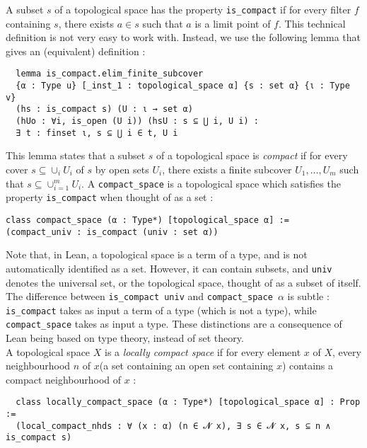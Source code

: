 \documentclass[11pt]{article}
\newcommand{\lean}[1]{\texttt{#1}\xspace} %
\begin{document}
A subset $s$ of a topological space has the property \lean{is\_compact} if for every filter $f$ containing 
$s$, there exists $a \in s$ such that $a$ is a limit point of $f$. This technical definition 
is not very easy to work with. Instead, we use the following lemma that gives an (equivalent) definition : 
\begin{lstlisting}
  lemma is_compact.elim_finite_subcover 
  {α : Type u} [_inst_1 : topological_space α] {s : set α} {ι : Type v} 
  (hs : is_compact s) (U : ι → set α) 
  (hUo : ∀i, is_open (U i)) (hsU : s ⊆ ⋃ i, U i) :
  ∃ t : finset ι, s ⊆ ⋃ i ∈ t, U i
\end{lstlisting}
This lemma states that a subset $s$ of a topological space is \textit{compact} if for every cover $s \subseteq \cup_{i} U_i$
of $s$ by open sets $U_i$, there exists a finite subcover $U_1, \dots, U_m$ such that
$s \subseteq \cup_{i = 1}^m U_i$. A \lean{compact\_space} is a topological space which satisfies the property 
\lean{is\_compact} when thought of as a set : 
\begin{lstlisting}
class compact_space (α : Type*) [topological_space α] :=
(compact_univ : is_compact (univ : set α))
\end{lstlisting}

Note that, in Lean, a topological space is a term of a type, and is not automatically identified as a 
set. However, it can contain subsets, and \lean{univ} denotes the universal set, or the topological space, 
thought of as a subset of itself. The difference between \lean{is\_compact univ} and \lean{compact\_space $\alpha$} is subtle : 
\lean{is\_compact} takes as input a term of a type (which is not a type), while \lean{compact\_space} 
takes as input a type. These distinctions are a consequence of Lean being based on type theory, instead of set theory. \\

A topological space $X$ is a \textit{locally compact space} if  for every element $x$ of $X$, 
every neighbourhood $n$ of $x$(a set containing an open set containing $x$) contains a compact 
neighbourhood of $x$ :
\begin{lstlisting}
  class locally_compact_space (α : Type*) [topological_space α] : Prop := 
  (local_compact_nhds : ∀ (x : α) (n ∈ 𝓝 x), ∃ s ∈ 𝓝 x, s ⊆ n ∧ is_compact s)
\end{lstlisting}
\end{document}
